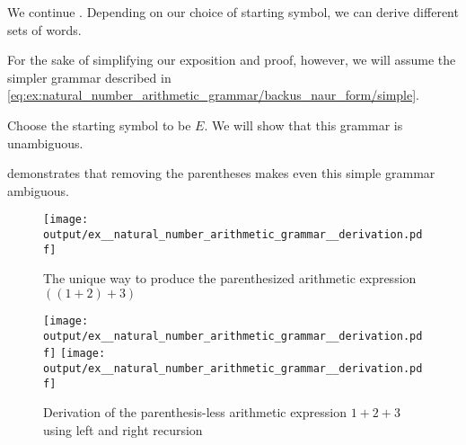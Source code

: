 \begin{example}\label{ex:natural_number_arithmetic_grammar/derivation}
  We continue . Depending on our choice of starting symbol, we can derive different sets of words.

  For the sake of simplifying our exposition and proof, however, we will assume the simpler grammar described in \eqref{eq:ex:natural_number_arithmetic_grammar/backus_naur_form/simple}.

  Choose the starting symbol to be \( E \). We will show that this grammar is unambiguous.

   demonstrates that removing the parentheses makes even this simple grammar ambiguous.

  \begin{figure}
    \hfill
    \texttt{[image: output/ex\_\_natural\_number\_arithmetic\_grammar\_\_derivation.pdf]}
    \hfill\hfill
    \caption{The unique way to produce the parenthesized arithmetic expression \( ((1 + 2) + 3) \)}
    \label{fig:ex:natural_number_arithmetic_grammar/derivation/unambiguous}
  \end{figure}

  \begin{figure}
    \hfill
    \texttt{[image: output/ex\_\_natural\_number\_arithmetic\_grammar\_\_derivation.pdf]}
    \hfill
    \texttt{[image: output/ex\_\_natural\_number\_arithmetic\_grammar\_\_derivation.pdf]}
    \hfill\hfill
    \caption{Derivation of the parenthesis-less arithmetic expression \( 1 + 2 + 3 \) using left and right recursion}
    \label{fig:ex:natural_number_arithmetic_grammar/derivation/ambiguous}
  \end{figure}
\end{example}
